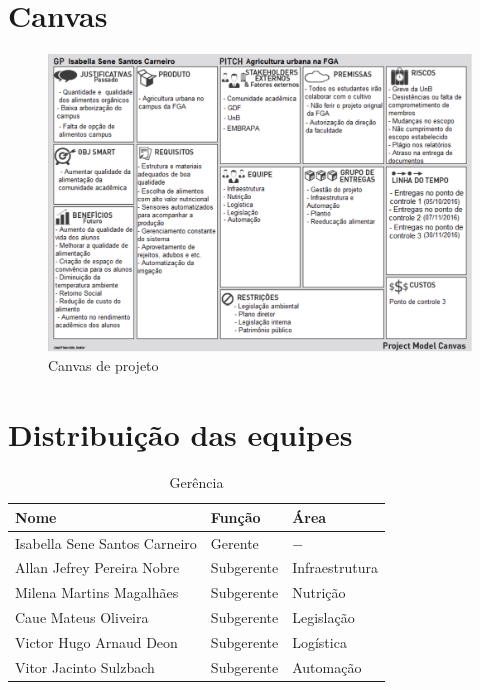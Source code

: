 \begin{anexosenv}

\partanexos

\chapter{Canvas}

  \begin{figure}[!htb]
    \label{canvas}
    \centering
    \includegraphics[width=17cm, keepaspectratio=true]{figuras/introducao/canvas.eps}
    \caption{Canvas de projeto}
  \end{figure}

\chapter{Distribuição das equipes}

  \begin{table}[!htb]
    \label{equipes}
    \centering
    \begin{tabular}{p{7cm}p{3cm}p{3cm}}
      \toprule
        \textbf{Nome} & \textbf{Função} & \textbf{Área} \\
      \midrule
        Isabella Sene Santos Carneiro & Gerente    & $-$            \\ \midrule
        Allan Jefrey Pereira Nobre    & Subgerente & Infraestrutura \\ \midrule
        Milena Martins Magalhães      & Subgerente & Nutrição       \\ \midrule
        Caue Mateus Oliveira          & Subgerente & Legislação     \\ \midrule
        Victor Hugo Arnaud Deon       & Subgerente & Logística      \\ \midrule
        Vitor Jacinto Sulzbach        & Subgerente & Automação      \\
      \bottomrule
    \end{tabular}
    \caption{Gerência}
  \end{table}


\end{anexosenv}
